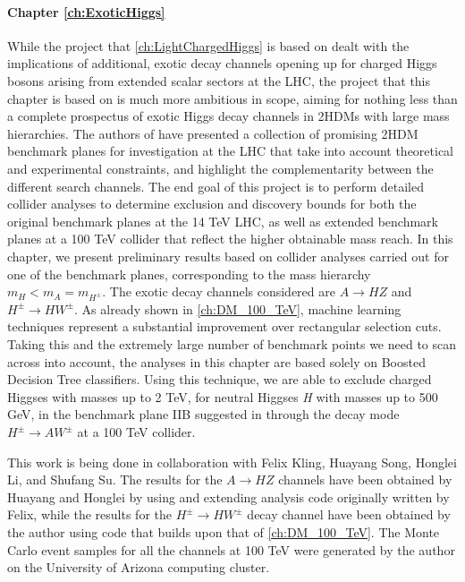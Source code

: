 \paragraph{Chapter \ref{ch:ExoticHiggs}}
While the project that \autoref{ch:LightChargedHiggs} is based on dealt with the implications of additional, exotic decay channels opening up for charged Higgs bosons arising from extended scalar sectors at the LHC, the project that this chapter is based on is much more ambitious in scope, aiming for nothing less than a complete prospectus of exotic Higgs decay channels in 2HDMs with large mass hierarchies. The authors of \citep{Kling2016} have presented a collection of promising 2HDM benchmark planes for investigation at the LHC that take into account theoretical and experimental constraints, and highlight the complementarity between the different search channels. The end goal of this project is to perform detailed collider analyses to determine exclusion and discovery bounds for both the original benchmark planes at the 14 TeV LHC, as well as extended benchmark planes at a 100 TeV collider that reflect the higher obtainable mass reach. In this chapter, we present preliminary results based on collider analyses carried out for one of the benchmark planes, corresponding to the mass hierarchy $m_H < m_A = m_{H^\pm}$. The exotic decay channels considered are $A\rightarrow HZ$ and $H^\pm\rightarrow HW^\pm$. As already shown in \autoref{ch:DM_100_TeV}, machine learning techniques represent a substantial improvement over rectangular selection cuts. Taking this and the extremely large number of benchmark points we need to scan across into account, the analyses in this chapter are based solely on Boosted Decision Tree classifiers. Using this technique, we are able to exclude charged Higgses with masses up to 2 TeV, for neutral Higgses \emph{H} with masses up to 500 GeV, in the benchmark plane IIB suggested in \cite{Kling2016} through the decay mode $H^\pm\rightarrow AW^\pm$ at a 100 TeV collider.

This work is being done in collaboration with Felix Kling, Huayang Song, Honglei Li, and Shufang Su. The results for the $A\rightarrow HZ$ channels have been obtained by Huayang and Honglei by using and extending analysis code originally written by Felix, while the results for the $H^\pm\rightarrow HW^\pm$ decay channel have been obtained by the author using code that builds upon that of \autoref{ch:DM_100_TeV}. The Monte Carlo event samples for all the channels at 100 TeV were generated by the author on the University of Arizona computing cluster. 
